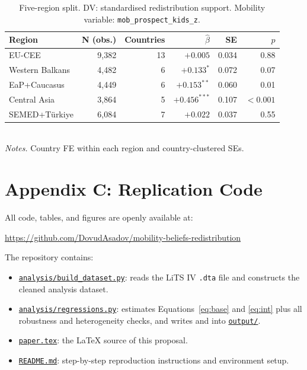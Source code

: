 \documentclass[11pt,a4paper]{article}
\begin{document}
\begin{table}[!ht]
\small
\centering
\caption{Five-region split. DV: standardised redistribution
support. Mobility variable: \texttt{mob\_prospect\_kids\_z}.}
\label{tab:regions}
\begin{tabular}{lrrrrr}
\toprule
Region & N (obs.) & Countries & $\hat\beta$ & SE & $p$ \\
\midrule
EU-CEE              & 9{,}382 & 13 & $+0.005$       & 0.034 & 0.88   \\
Western Balkans     & 4{,}482 & 6  & $+0.133^{*}$   & 0.072 & 0.07   \\
EaP+Caucasus        & 4{,}449 & 6  & $+0.153^{**}$  & 0.060 & 0.01   \\
Central Asia        & 3{,}864 & 5  & $+0.456^{***}$ & 0.107 & $<0.001$\\
SEMED+Türkiye       & 6{,}084 & 7  & $+0.022$       & 0.037 & 0.55   \\
\bottomrule
\end{tabular}
\\\footnotesize \emph{Notes.} Country FE within each region and country-clustered SEs.
\end{table}

\clearpage
\section*{Appendix C: Replication Code}

All code, tables, and figures are openly available at:
\begin{center}
\url{https://github.com/DovudAsadov/mobility-beliefs-redistribution}
\end{center}

\noindent The repository contains:
\begin{itemize}[leftmargin=18pt,itemsep=2pt]
    \item \href{https://github.com/DovudAsadov/mobility-beliefs-redistribution/blob/main/analysis/build_dataset.py}{\texttt{analysis/build\_dataset.py}}: reads the LiTS IV \texttt{.dta} file and constructs the cleaned analysis dataset.
    \item \href{https://github.com/DovudAsadov/mobility-beliefs-redistribution/blob/main/analysis/regressions.py}{\texttt{analysis/regressions.py}}: estimates Equations~\eqref{eq:base} and \eqref{eq:int} plus all robustness and
    heterogeneity checks, and writes  and
     into
    \href{https://github.com/DovudAsadov/mobility-beliefs-redistribution/tree/main/output}{\texttt{output/}}.
    \item \href{https://github.com/DovudAsadov/mobility-beliefs-redistribution/blob/main/paper.tex}{\texttt{paper.tex}}:
    the LaTeX source of this proposal.
    \item \href{https://github.com/DovudAsadov/mobility-beliefs-redistribution/blob/main/README.md}{\texttt{README.md}}:
    step-by-step reproduction instructions and environment setup.
\end{itemize}
\end{document}
